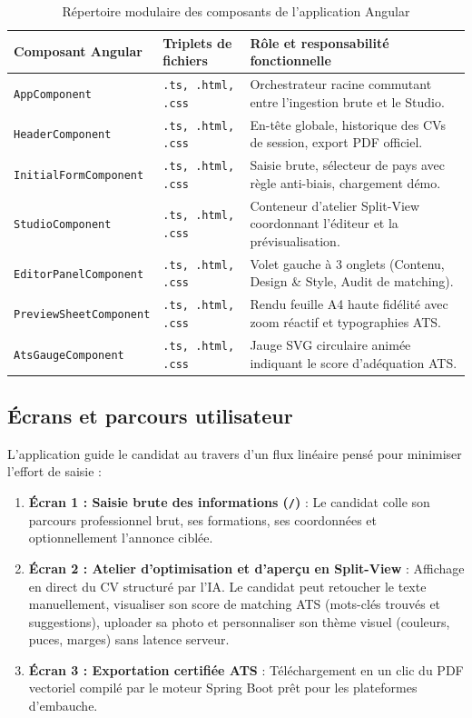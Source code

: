 \documentclass[11pt,a4paper]{article}
\begin{document}
\begin{table}[h!]
\centering
\small
\renewcommand{\arraystretch}{1.2}
\begin{tabularx}{\textwidth}{|l|l|X|}
\hline
\rowcolor{headergray}
\textbf{Composant Angular} & \textbf{Triplets de fichiers} & \textbf{Rôle et responsabilité fonctionnelle} \\
\hline
\texttt{AppComponent} & \texttt{.ts, .html, .css} & Orchestrateur racine commutant entre l'ingestion brute et le Studio. \\
\hline
\texttt{HeaderComponent} & \texttt{.ts, .html, .css} & En-tête globale, historique des CVs de session, export PDF officiel. \\
\hline
\texttt{InitialFormComponent} & \texttt{.ts, .html, .css} & Saisie brute, sélecteur de pays avec règle anti-biais, chargement démo. \\
\hline
\texttt{StudioComponent} & \texttt{.ts, .html, .css} & Conteneur d'atelier Split-View coordonnant l'éditeur et la prévisualisation. \\
\hline
\texttt{EditorPanelComponent} & \texttt{.ts, .html, .css} & Volet gauche à 3 onglets (Contenu, Design \& Style, Audit de matching). \\
\hline
\texttt{PreviewSheetComponent} & \texttt{.ts, .html, .css} & Rendu feuille A4 haute fidélité avec zoom réactif et typographies ATS. \\
\hline
\texttt{AtsGaugeComponent} & \texttt{.ts, .html, .css} & Jauge SVG circulaire animée indiquant le score d'adéquation ATS. \\
\hline
\end{tabularx}
\caption{Répertoire modulaire des composants de l'application Angular}
\end{table}

\subsection{Écrans et parcours utilisateur}

L'application guide le candidat au travers d'un flux linéaire pensé pour minimiser l'effort de saisie :
\begin{enumerate}
    \item \textbf{Écran 1 : Saisie brute des informations (\texttt{/})} : Le candidat colle son parcours professionnel brut, ses formations, ses coordonnées et optionnellement l'annonce ciblée.
    \item \textbf{Écran 2 : Atelier d'optimisation et d'aperçu en Split-View} : Affichage en direct du CV structuré par l'IA. Le candidat peut retoucher le texte manuellement, visualiser son score de matching ATS (mots-clés trouvés et suggestions), uploader sa photo et personnaliser son thème visuel (couleurs, puces, marges) sans latence serveur.
    \item \textbf{Écran 3 : Exportation certifiée ATS} : Téléchargement en un clic du PDF vectoriel compilé par le moteur Spring Boot prêt pour les plateformes d'embauche.
\end{enumerate}
\end{document}
